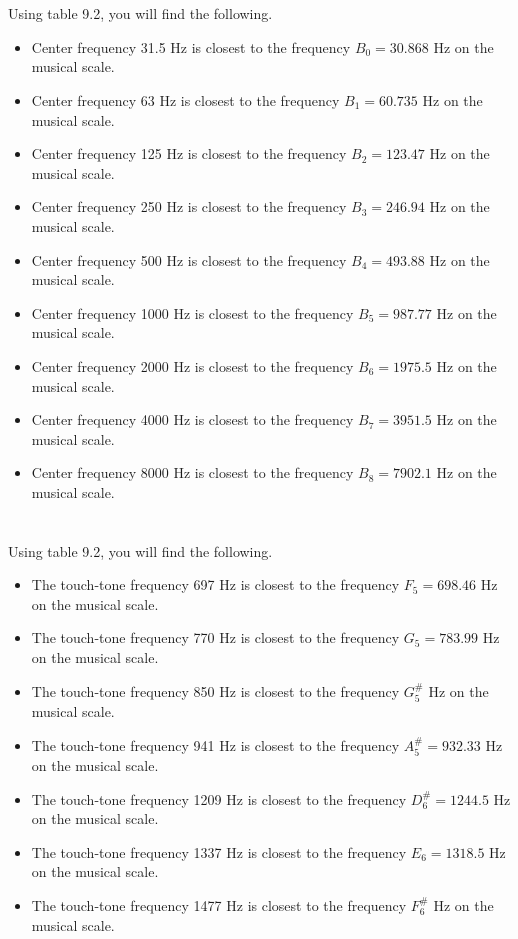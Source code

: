 \documentclass{article}
\begin{document}
\section{}

Using table 9.2, you will find the following.

\begin{itemize}
    \item Center frequency 31.5 Hz is closest to the frequency $B_0=30.868$ Hz on the musical scale.
    \item Center frequency 63 Hz is closest to the frequency $B_1=60.735$ Hz on the musical scale.
    \item Center frequency 125 Hz is closest to the frequency $B_2=123.47$ Hz on the musical scale.
    \item Center frequency 250 Hz is closest to the frequency $B_3=246.94$ Hz on the musical scale.
    \item Center frequency 500 Hz is closest to the frequency $B_4=493.88$ Hz on the musical scale.
    \item Center frequency 1000 Hz is closest to the frequency $B_5=987.77$ Hz on the musical scale.
    \item Center frequency 2000 Hz is closest to the frequency $B_6=1975.5$ Hz on the musical scale.
    \item Center frequency 4000 Hz is closest to the frequency $B_7=3951.5$ Hz on the musical scale.
    \item Center frequency 8000 Hz is closest to the frequency $B_8=7902.1$ Hz on the musical scale.
\end{itemize}
%
\section{}

Using table 9.2, you will find the following.

\begin{itemize}
    \item The touch-tone frequency 697 Hz is closest to the frequency $F_5=698.46$ Hz on the musical scale.
    \item The touch-tone frequency 770 Hz is closest to the frequency $G_5=783.99$ Hz on the musical scale.
    \item The touch-tone frequency 850 Hz is closest to the frequency $G_5^\#$ Hz on the musical scale.
    \item The touch-tone frequency 941 Hz is closest to the frequency $A_5^\# = 932.33$ Hz on the musical scale.
    \item The touch-tone frequency 1209 Hz is closest to the frequency $D_6^\# = 1244.5$ Hz on the musical scale.
    \item The touch-tone frequency 1337 Hz is closest to the frequency $ E_6 = 1318.5$ Hz on the musical scale.
    \item The touch-tone frequency 1477 Hz is closest to the frequency $F_6^\# $ Hz on the musical scale.
\end{itemize}
%
\end{document}
